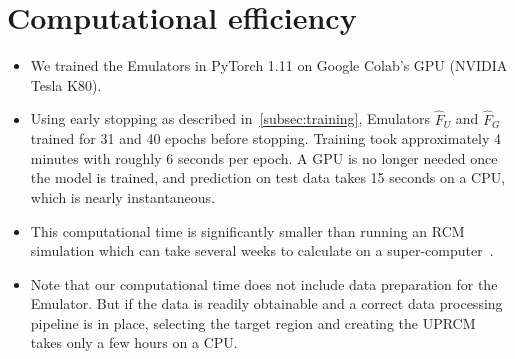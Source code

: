 \documentclass[a4paper,11pt,oneside]{report}
\begin{document}
\section{Computational efficiency}\label{sec:computational-efficiency}
\begin{itemize}
\item We trained the Emulators in PyTorch 1.11 on Google Colab's GPU (NVIDIA Tesla K80).
    \item Using early stopping as described in~\autoref{subsec:training}, Emulators $\hat{F}_U$ and $\hat{F}_G$ trained for 31 and 40 epochs before stopping. Training took approximately 4 minutes with roughly 6 seconds per epoch. A GPU is no longer needed once the model is trained, and prediction on test data takes 15 seconds on a CPU, which is nearly instantaneous. 
    \item This computational time is significantly smaller than running an RCM simulation which can take several weeks to calculate on a super-computer~\cite{Doury}. 
    \item Note that our computational time does not include data preparation for the Emulator. But if the data is readily obtainable and a correct data processing pipeline is in place, selecting the target region and creating the UPRCM takes only a few hours on a CPU.   
\end{itemize}
\end{document}
